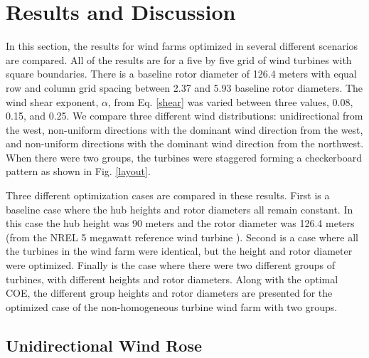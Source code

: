 \documentclass[conf]{new-aiaa}
\begin{document}
\section{Results and Discussion}

In this section, the results for wind farms optimized in several different scenarios are compared. All of the results are for a five by five grid of wind turbines with square boundaries. There is a baseline rotor diameter of 126.4 meters with equal row and column grid spacing between 2.37 and 5.93 baseline rotor diameters. The wind shear exponent, $\alpha$, from Eq. \ref{shear} was varied between three values, 0.08, 0.15, and 0.25. We compare three different wind distributions: unidirectional from the west, non-uniform directions with the dominant wind direction from the west, and non-uniform directions with the dominant wind direction from the northwest. When there were two groups, the turbines were staggered forming a checkerboard pattern as shown in Fig. \ref{layout}.

Three different optimization cases are compared in these results. First is a baseline case where the hub heights and rotor diameters all remain constant. In this case the hub height was 90 meters and the rotor diameter was 126.4 meters (from the NREL 5 megawatt reference wind turbine \cite{NREL5MW}). Second is a case where all the turbines in the wind farm were identical, but the height and rotor diameter were optimized. Finally is the case where there were two different groups of turbines, with different heights and rotor diameters. 
Along with the optimal COE, the different group heights and rotor diameters are presented for the optimized case of the non-homogeneous turbine wind farm with two groups.

\subsection{Unidirectional Wind Rose}
\end{document}
